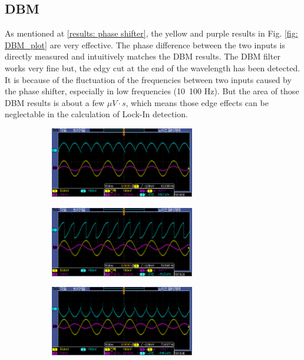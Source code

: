 \documentclass{article}
\begin{document}
\subsection{DBM}
As mentioned at \ref{results: phase shifter}, the yellow and purple results in Fig. \ref{fig: DBM_plot} are very effective.
The phase difference between the two inputs is directly measured and intuitively matches the DBM results.
The DBM filter works very fine but, the edgy cut at the end of the wavelength has been detected.
It is because of the fluctuation of the frequencies between two inputs caused by the phase shifter, especially in low frequencies (10~100 Hz).
But the area of those DBM results is about a few $\mu V \cdot s$, which means those edge effects can be neglectable in the calculation of Lock-In detection.

\begin{figure}[ht]
  \begin{subfigure}[b]{6.3cm}
      \centering
      \includegraphics[width=6.3cm]{../raw_data/TEK00355.PNG}
      \caption{}
  \end{subfigure}
  \hfill
  \begin{subfigure}[b]{6.3cm}
    \centering
    \includegraphics[width=6.3cm]{../raw_data/TEK00356.PNG}
    \caption{}
\end{subfigure}
\hfill
\begin{subfigure}[b]{6.3cm}
  \centering
  \includegraphics[width=6.3cm]{../raw_data/TEK00357.PNG}
  \caption{}
\end{subfigure}
\hfill

\end{figure}
\end{document}
